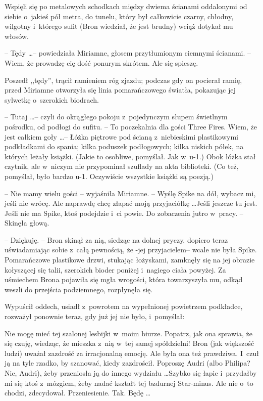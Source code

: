 \documentclass[oneside,polish,11pt,rmheadings]{mwbk}
\begin{document}
Wspięli się po metalowych schodkach między dwiema ścianami oddalonymi od siebie o~jakieś pół metra, do tunelu, który był całkowicie czarny, chłodny, wilgotny i~którego sufit (Bron wiedział, że jest brudny) wciąż dotykał mu włosów. 

-- Tędy \ldots  -- powiedziała Miriamne, głosem przytłumionym ciemnymi ścianami. -- Wiem, że prowadzę cię dość ponurym skrótem. Ale się spieszę. 

Poszedł ,,tędy'', trącił ramieniem róg zjazdu; podczas gdy on pocierał ramię, przed Miriamne otworzyła się linia pomarańczowego światła, pokazując jej sylwetkę o~szerokich biodrach. 

-- Tutaj \ldots -- czyli do okrągłego pokoju z~pojedynczym słupem świetlnym pośrodku, od podłogi do sufitu. -- To poczekalnia dla gości Three Fires. Wiem, że jest całkiem goły \ldots  -- Łóżka piętrowe pod ścianą z~niebieskimi plastikowymi podkładkami do spania; kilka poduszek podłogowych; kilka niskich półek, na których leżały książki. (Jakie to osobliwe, pomyślał. Jak w~u-1.) Obok łóżka stał czytnik, ale w~niczym nie przypominał szuflady na akta biblioteki. (Co też, pomyślał, było bardzo u-1.  Oczywiście wszystkie książki są poezją.) 

-- Nie mamy wielu gości -- wyjaśniła Miriamne. -- Wyślę Spike na dół, wybacz mi, jeśli nie wrócę. Ale naprawdę chcę złapać moją przyjaciółkę \ldots  Jeśli jeszcze tu jest. Jeśli nie ma Spike, ktoś podejdzie i~ci powie. Do zobaczenia jutro w~pracy. -- Skinęła głową.  

-- Dziękuję. -- Bron skinął za nią, siedząc na dolnej pryczy, dopiero teraz uświadamiając sobie z~całą pewnością, że -jej przyjacielem-- wcale nie była Spike. Pomarańczowe plastikowe drzwi, stukając łożyskami, zamknęły się na jej obrazie kołyszącej się talii, szerokich bioder poniżej i~nagiego ciała powyżej. Za uśmiechem Brona pojawiła się mgła wrogości, która towarzyszyła mu, odkąd weszli do przejścia podziemnego, rozpłynęła się. 

Wypuścił oddech, usiadł z~powrotem na wypełnionej powietrzem podkładce, rozważył ponownie teraz, gdy już jej nie było, i~pomyślał:  

Nie mogę mieć tej szalonej lesbijki w~moim biurze. Popatrz, jak ona sprawia, że się czuję, wiedząc, że mieszka z~nią w~tej samej spółdzielni!  Bron (jak większość ludzi) uważał zazdrość za irracjonalną emocję. Ale była ona też prawdziwa. I~czuł ją na tyle rzadko, by szanować, kiedy zazdrościł.  Poproszę Audri (albo Philipa? Nie, Audri), żeby przeniosła ją do innego wydziału \ldots  Szybko się łapie i~przydałby mi się ktoś z~mózgiem, żeby nadać kształt tej bzdurnej Star-minus. Ale nie o~to chodzi, zdecydował. Przeniesienie. Tak. Będę \ldots  
\end{document}
